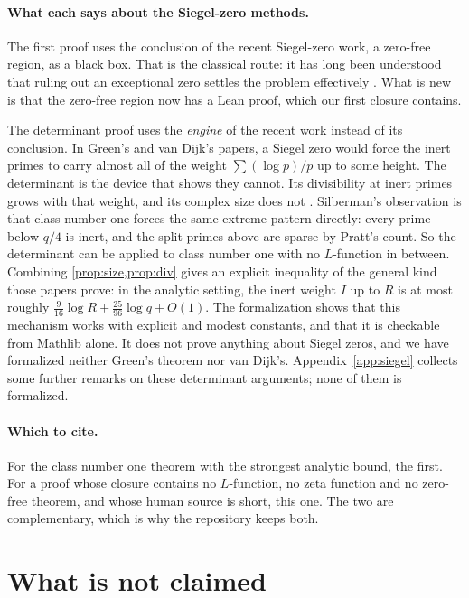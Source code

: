 \documentclass[11pt]{article}
\theoremstyle{definition}
\begin{document}
\paragraph{What each says about the Siegel-zero methods.} The first proof uses the conclusion of the recent Siegel-zero work, a zero-free region, as a black box. That is the classical route: it has long been understood that ruling out an exceptional zero settles the problem effectively \cite{Heilbronn1934,Goldfeld1985}. What is new is that the zero-free region now has a Lean proof, which our first closure contains.

The determinant proof uses the \emph{engine} of the recent work instead of its conclusion. In Green's and van Dijk's papers, a Siegel zero would force the inert primes to carry almost all of the weight $\sum (\log p)/p$ up to some height. The determinant is the device that shows they cannot. Its divisibility at inert primes grows with that weight, and its complex size does not \cite{Green2026,vanDijk2026v1,vanDijk2026v2}. Silberman's observation is that class number one forces the same extreme pattern directly: every prime below $q/4$ is inert, and the split primes above are sparse by Pratt's count. So the determinant can be applied to class number one with no $L$-function in between. Combining \cref{prop:size,prop:div} gives an explicit inequality of the general kind those papers prove: in the analytic setting, the inert weight $I$ up to $R$ is at most roughly $\frac{9}{16}\log R + \frac{25}{96}\log q + O(1)$. The formalization shows that this mechanism works with explicit and modest constants, and that it is checkable from Mathlib alone. It does not prove anything about Siegel zeros, and we have formalized neither Green's theorem nor van Dijk's. Appendix~\ref{app:siegel} collects some further remarks on these determinant arguments; none of them is formalized.

\paragraph{Which to cite.} For the class number one theorem with the strongest analytic bound, the first. For a proof whose closure contains no $L$-function, no zeta function and no zero-free theorem, and whose human source is short, this one. The two are complementary, which is why the repository keeps both.

\section{What is not claimed}\label{sec:notclaimed}
\end{document}
